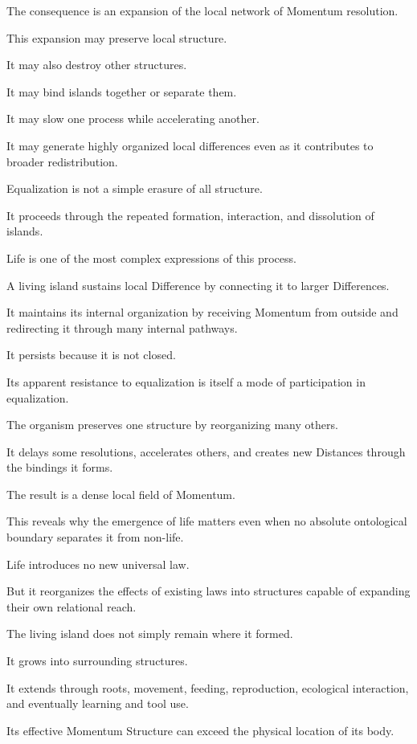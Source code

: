 The consequence is an expansion of the local network of Momentum resolution.

This expansion may preserve local structure.

It may also destroy other structures.

It may bind islands together or separate them.

It may slow one process while accelerating another.

It may generate highly organized local differences even as it contributes to broader redistribution.

Equalization is not a simple erasure of all structure.

It proceeds through the repeated formation, interaction, and dissolution of islands.

Life is one of the most complex expressions of this process.

A living island sustains local Difference by connecting it to larger Differences.

It maintains its internal organization by receiving Momentum from outside and redirecting it through many internal pathways.

It persists because it is not closed.

Its apparent resistance to equalization is itself a mode of participation in equalization.

The organism preserves one structure by reorganizing many others.

It delays some resolutions, accelerates others, and creates new Distances through the bindings it forms.

The result is a dense local field of Momentum.

This reveals why the emergence of life matters even when no absolute ontological boundary separates it from non-life.

Life introduces no new universal law.

But it reorganizes the effects of existing laws into structures capable of expanding their own relational reach.

The living island does not simply remain where it formed.

It grows into surrounding structures.

It extends through roots, movement, feeding, reproduction, ecological interaction, and eventually learning and tool use.

Its effective Momentum Structure can exceed the physical location of its body.

